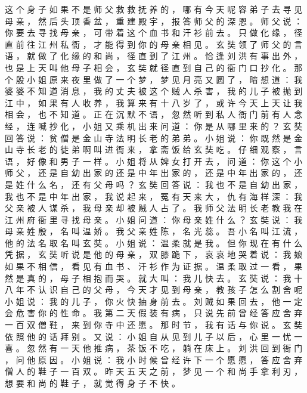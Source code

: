 {这 个 身 子 如 果 不 是 师 父 救 救 抚 养 的 ， 哪 有 今 天 呢 容 弟 子 去 寻 见 母 亲 ， 然 后 头 顶 香 盆 ， 重 建 殿 宇 ， 报 答 师 父 的 深 恩 。
师 父 说 ： 你 要 去 寻 找 母 亲 ， 可 带 着 这 个 血 书 和 汗 衫 前 去 。
只 做 化 缘 ， 径 直 前 往 江 州 私 衙 ， 才 能 得 到 你 的 母 亲 相 见 。
玄 奘 领 了 师 父 的 言 语 ， 就 做 了 化 缘 的 和 尚 ， 径 直 到 了 江 州 。
恰 逢 刘 洪 有 事 出 外 ， 也 是 上 天 叫 他 母 子 相 会 ， 玄 奘 就 径 直 到 自 己 的 衙 门 口 抄 化 。
那 个 殷 小 姐 原 来 夜 里 做 了 一 个 梦 ， 梦 见 月 亮 又 圆 了 ， 暗 想 道 ： 我 婆 婆 不 知 道 消 息 ， 我 的 丈 夫 被 这 个 贼 人 杀 害 ， 我 的 儿 子 被 抛 到 江 中 ， 如 果 有 人 收 养 ， 我 算 来 有 十 八 岁 了 ， 或 许 今 天 上 天 让 我 相 会 ， 也 不 知 道 。
正 在 沉 默 不 语 ， 忽 然 听 到 私 人 衙 门 前 有 人 念 经 ， 连 喊 抄 化 ， 小 姐 又 乘 机 出 来 问 道 ： 你 是 从 哪 里 来 的 ？ 玄 奘 回 答 说 ： 贫 僧 是 金 山 寺 法 明 长 老 的 弟 弟 。
小 姐 说 ： 你 既 然 是 金 山 寺 长 老 的 徒 弟 啊 叫 进 衙 来 ， 拿 斋 饭 给 玄 奘 吃 。
仔 细 观 察 ， 言 语 ， 好 像 和 男 子 一 样 。
小 姐 将 从 婢 女 打 开 去 ， 问 道 ： 你 这 个 小 师 父 ， 还 是 自 幼 出 家 的 还 是 中 年 出 家 的 ， 还 是 中 年 出 家 的 ， 还 是 姓 什 么 名 ， 还 有 父 母 吗 ？ 玄 奘 回 答 说 ： 我 也 不 是 自 幼 出 家 ， 我 也 不 是 中 年 出 家 ， 我 说 起 来 ， 冤 有 天 来 大 ， 仇 有 海 样 深 ： 我 父 亲 被 人 谋 杀 ， 我 母 亲 却 被 贼 人 占 了 。
我 师 父 法 明 长 老 教 我 在 江 州 府 衙 里 寻 找 母 亲 。
小 姐 问 道 ： 你 母 亲 姓 什 么 ？ 玄 奘 说 ： 我 母 亲 姓 殷 ， 名 叫 温 娇 。
我 父 亲 姓 陈 ， 名 光 蕊 。
吾 小 名 叫 江 流 ， 他 的 法 名 取 名 叫 玄 奘 。
小 姐 说 ： 温 柔 就 是 我 。
但 你 现 在 有 什 么 凭 据 ， 玄 奘 听 说 是 他 的 母 亲 ， 双 膝 跪 下 ， 哀 哀 地 哭 着 说 ： 我 娘 如 果 不 相 信 ， 看 见 有 血 书 、 汗 衫 作 为 证 据 。
温 柔 取 过 一 看 ， 果 然 是 真 的 ， 母 子 相 抱 而 哭 。
就 大 叫 ： 我 儿 快 去 。
玄 奘 说 ： 我 十 八 年 不 认 识 自 己 的 父 母 ， 今 天 才 见 到 母 亲 ， 教 孩 子 怎 么 割 舍 呢 小 姐 说 ： 我 的 儿 子 ， 你 火 快 抽 身 前 去 。
刘 贼 如 果 回 去 ， 他 一 定 会 危 害 你 的 性 命 。
我 第 二 天 假 装 有 病 ， 只 说 先 前 曾 经 答 应 舍 弃 一 百 双 僧 鞋 ， 来 到 你 寺 中 还 愿 。
那 时 节 ， 我 有 话 与 你 说 。
玄 奘 依 照 他 的 话 拜 别 。
又 说 ： 小 姐 自 从 见 到 儿 子 以 后 ， 心 里 一 忧 一 喜 。
忽 然 有 一 天 他 推 病 ， 茶 饭 不 吃 ， 躺 在 床 上 。
刘 洪 回 到 衙 门 ， 问 他 原 因 。
小 姐 说 ： 我 小 时 候 曾 经 许 下 一 个 愿 愿 ， 答 应 舍 弃 僧 人 的 鞋 子 一 百 双 。
昨 天 五 天 之 前 ， 梦 见 一 个 和 尚 手 拿 利 刃 ， 想 要 和 尚 的 鞋 子 ， 就 觉 得 身 子 不 快 。
}

